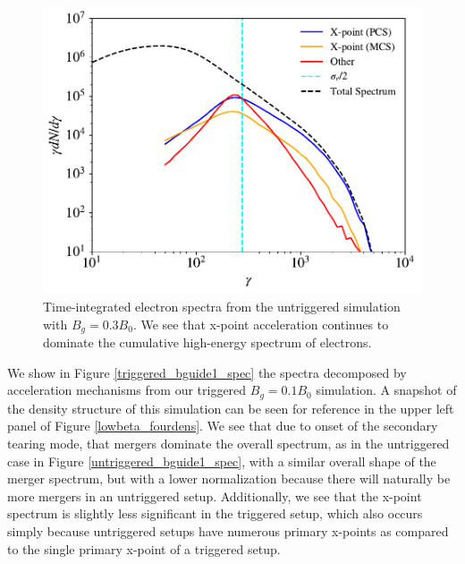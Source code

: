 \documentclass[iop,twocolappendix]{emulateapj}
\begin{document}
\begin{figure}[htp]
	\includegraphics[width=\linewidth]{bguide3_untriggered_withspec.pdf}
	\caption{Time-integrated electron spectra from the untriggered simulation with $B_{g}=0.3B_{0}$.  We see that x-point acceleration continues to dominate the cumulative high-energy spectrum of electrons. }
	\label{untriggered_bguide3_spec}
\end{figure}

We show in Figure \ref{triggered_bguide1_spec} the spectra decomposed by acceleration mechanisms from our triggered $B_{g}=0.1B_{0}$ simulation.  A snapshot of the density structure of this simulation can be seen for reference in the upper left panel of Figure \ref{lowbeta_fourdens}.  We see that due to onset of the secondary tearing mode, that mergers dominate the overall spectrum, as in the untriggered case in Figure \ref{untriggered_bguide1_spec}, with a similar overall shape of the merger spectrum, but with a lower normalization because there will naturally be more mergers in an untriggered setup.  Additionally, we see that the x-point spectrum is slightly less significant in the triggered setup, which also occurs simply because  untriggered setups have numerous primary x-points as compared to the single primary x-point of a triggered setup.
\end{document}
